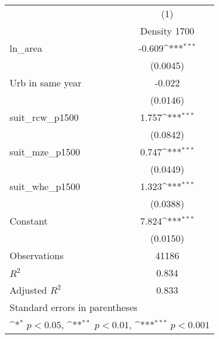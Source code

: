 {
\def\sym#1{\ifmmode^{#1}\else\(^{#1}\)\fi}
\begin{tabular}{l*{1}{c}}
\toprule
                    &\multicolumn{1}{c}{(1)}\\
                    &\multicolumn{1}{c}{Density 1700}\\
\midrule
ln\_area             &      -0.609\sym{***}\\
                    &    (0.0045)         \\
\addlinespace
Urb in same year    &      -0.022         \\
                    &    (0.0146)         \\
\addlinespace
suit\_rcw\_p1500      &       1.757\sym{***}\\
                    &    (0.0842)         \\
\addlinespace
suit\_mze\_p1500      &       0.747\sym{***}\\
                    &    (0.0449)         \\
\addlinespace
suit\_whe\_p1500      &       1.323\sym{***}\\
                    &    (0.0388)         \\
\addlinespace
Constant            &       7.824\sym{***}\\
                    &    (0.0150)         \\
\midrule
Observations        &       41186         \\
\(R^{2}\)           &       0.834         \\
Adjusted \(R^{2}\)  &       0.833         \\
\bottomrule
\multicolumn{2}{l}{\footnotesize Standard errors in parentheses}\\
\multicolumn{2}{l}{\footnotesize \sym{*} \(p<0.05\), \sym{**} \(p<0.01\), \sym{***} \(p<0.001\)}\\
\end{tabular}
}
